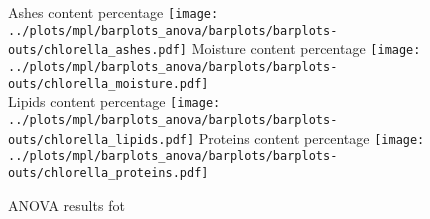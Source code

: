 
\begin{figure}[H]
\centering
	\subcaptionbox%
	{Ashes content percentage\label{subfig:chlorella_ashes}}%
		{\texttt{[image: ../plots/mpl/barplots\_anova/barplots/barplots-outs/chlorella\_ashes.pdf]}}%
\hspace*{\hbtwsfig}%
	\subcaptionbox%
	{Moisture content percentage\label{subfig:chlorella_moisture}}%
		{\texttt{[image: ../plots/mpl/barplots\_anova/barplots/barplots-outs/chlorella\_moisture.pdf]}}%
\\[2ex]
	\subcaptionbox%
	{Lipids content percentage\label{subfig:chlorella_lipids}}%
		{\texttt{[image: ../plots/mpl/barplots\_anova/barplots/barplots-outs/chlorella\_lipids.pdf]}}%
\hspace*{\hbtwsfig}%
	\subcaptionbox%
	{Proteins content percentage\label{subfig:chlorella_proteins}}%
		{\texttt{[image: ../plots/mpl/barplots\_anova/barplots/barplots-outs/chlorella\_proteins.pdf]}}%
\caption%
{ANOVA results fot }
\label{fig:chlorellabla}
\end{figure}
